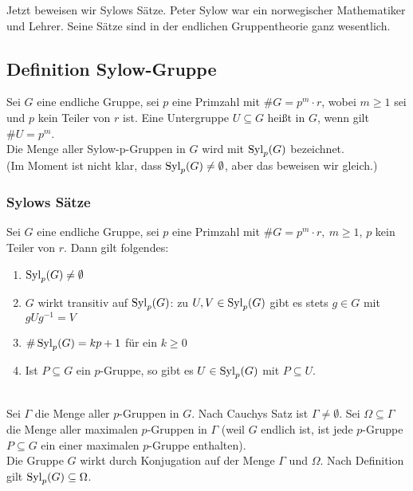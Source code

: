 Jetzt beweisen wir Sylows Sätze. Peter Sylow war ein norwegischer Mathematiker und Lehrer. Seine Sätze sind in der endlichen Gruppentheorie ganz wesentlich.

\subsection{Definition Sylow-Gruppe}
\label{sub:def_sylow_gruppe}
Sei $G$ eine endliche Gruppe, sei $p$ eine Primzahl mit $\#G=p^m\cdot r$, wobei $m\ge 1$ sei und $p$ kein Teiler von $r$ ist. Eine Untergruppe $U\subseteq G$ heißt  in $G$, wenn gilt $\#U=p^m$.\\
Die Menge aller Sylow-p-Gruppen in $G$ wird mit $\operatorname{Syl}_p(G)$ bezeichnet.\\
(Im Moment ist nicht klar, dass $\operatorname{Syl}_p(G)\not=\emptyset$, aber das beweisen wir gleich.)

\subsubsection*{Sylows Sätze}
\label{ssub:sylows_sätze}
Sei $G$ eine endliche Gruppe, sei $p$ eine Primzahl mit $\#G=p^m\cdot r,~m\ge 1$, $p$ kein Teiler von $r$. Dann gilt folgendes:\\
\begin{enumerate}[(1)]
	\item $\operatorname{Syl}_p(G)\not=\emptyset$
	\item $G$ wirkt transitiv auf $\operatorname{Syl}_p(G)$: zu $U,V\in \operatorname{Syl}_p(G)$ gibt es stets $g\in G$ mit $gUg^{-1}=V$
	\item $\#\operatorname{Syl}_p(G)=kp+1$ für ein $k\ge 0$
	\item Ist $P\subseteq G$ ein $p$-Gruppe, so gibt es $U\in \operatorname{Syl}_p(G)$ mit $P\subseteq U$.
\end{enumerate}

\\
Sei $\Gamma$ die Menge aller $p$-Gruppen in $G$. Nach Cauchys Satz ist $\Gamma\not=\emptyset$. Sei $\Omega\subseteq \Gamma$ die Menge aller maximalen $p$-Gruppen in $\Gamma$ (weil $G$ endlich ist, ist jede $p$-Gruppe $P\subseteq G$ ein einer maximalen $p$-Gruppe enthalten).\\
Die Gruppe $G$ wirkt durch Konjugation auf der Menge $\Gamma$ und $\Omega$. Nach Definition gilt $\operatorname{Syl}_p(G)\subseteq \Omega$.\\

